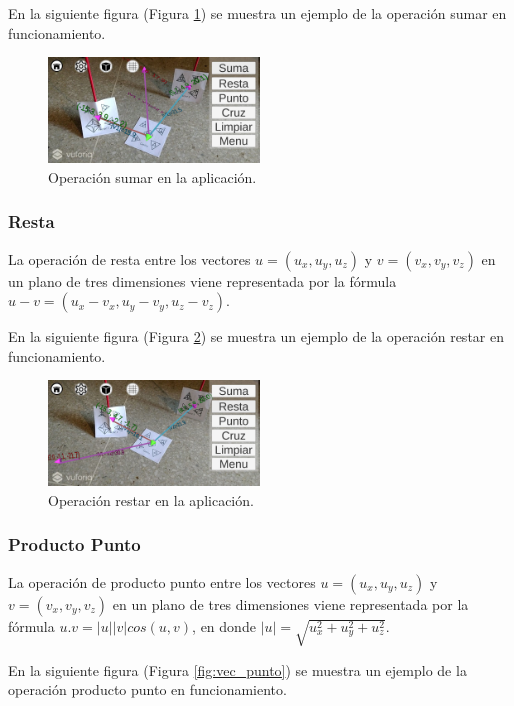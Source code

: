 En la siguiente figura (Figura \ref{fig:vec_suma}) se muestra un ejemplo de la operación sumar en funcionamiento.

\begin{figure}[hbt!]
\centering
\includegraphics[width=0.5\textwidth]{figuras/vectores/Suma.png}
\caption{\label{fig:vec_suma}Operación sumar en la aplicación.}
\end{figure}
\FloatBarrier

\subsubsection{Resta}
La operación de resta entre los vectores $u=(u_x,u_y,u_z)$ y $v=(v_x,v_y,v_z)$ en un plano de tres dimensiones viene representada por la fórmula $u - v = (u_x-v_x, u_y-v_y, u_z-v_z)$.

En la siguiente figura (Figura \ref{fig:vec_resta}) se muestra un ejemplo de la operación restar en funcionamiento.

\begin{figure}[hbt!]
\centering
\includegraphics[width=0.5\textwidth]{figuras/vectores/Resta.png}
\caption{\label{fig:vec_resta}Operación restar en la aplicación.}
\end{figure}
\FloatBarrier

\subsubsection{Producto Punto}
La operación de producto punto entre los vectores $u=(u_x,u_y,u_z)$ y $v=(v_x,v_y,v_z)$ en un plano de tres dimensiones viene representada por la fórmula $u . v = | u | | v | cos(u,v)$, en donde $| u | = \sqrt{u_x^2 + u_y^2 + u_z^2}$.

En la siguiente figura (Figura \ref{fig:vec_punto}) se muestra un ejemplo de la operación producto punto en funcionamiento.

